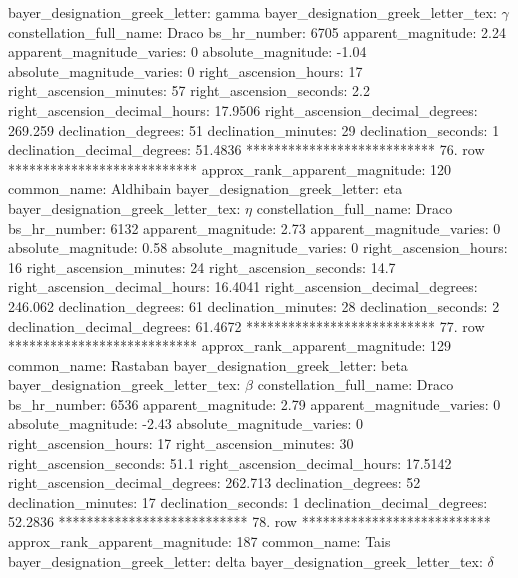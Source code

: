     bayer_designation_greek_letter: gamma
bayer_designation_greek_letter_tex: $\gamma$
           constellation_full_name: Draco
                      bs_hr_number: 6705
                apparent_magnitude: 2.24
         apparent_magnitude_varies: 0
                absolute_magnitude: -1.04
         absolute_magnitude_varies: 0
             right_ascension_hours: 17
           right_ascension_minutes: 57
           right_ascension_seconds: 2.2
     right_ascension_decimal_hours: 17.9506
   right_ascension_decimal_degrees: 269.259
               declination_degrees: 51
               declination_minutes: 29
               declination_seconds: 1
       declination_decimal_degrees: 51.4836
*************************** 76. row ***************************
    approx_rank_apparent_magnitude: 120
                       common_name: Aldhibain
    bayer_designation_greek_letter: eta
bayer_designation_greek_letter_tex: $\eta$
           constellation_full_name: Draco
                      bs_hr_number: 6132
                apparent_magnitude: 2.73
         apparent_magnitude_varies: 0
                absolute_magnitude: 0.58
         absolute_magnitude_varies: 0
             right_ascension_hours: 16
           right_ascension_minutes: 24
           right_ascension_seconds: 14.7
     right_ascension_decimal_hours: 16.4041
   right_ascension_decimal_degrees: 246.062
               declination_degrees: 61
               declination_minutes: 28
               declination_seconds: 2
       declination_decimal_degrees: 61.4672
*************************** 77. row ***************************
    approx_rank_apparent_magnitude: 129
                       common_name: Rastaban
    bayer_designation_greek_letter: beta
bayer_designation_greek_letter_tex: $\beta$
           constellation_full_name: Draco
                      bs_hr_number: 6536
                apparent_magnitude: 2.79
         apparent_magnitude_varies: 0
                absolute_magnitude: -2.43
         absolute_magnitude_varies: 0
             right_ascension_hours: 17
           right_ascension_minutes: 30
           right_ascension_seconds: 51.1
     right_ascension_decimal_hours: 17.5142
   right_ascension_decimal_degrees: 262.713
               declination_degrees: 52
               declination_minutes: 17
               declination_seconds: 1
       declination_decimal_degrees: 52.2836
*************************** 78. row ***************************
    approx_rank_apparent_magnitude: 187
                       common_name: Tais
    bayer_designation_greek_letter: delta
bayer_designation_greek_letter_tex: $\delta$
